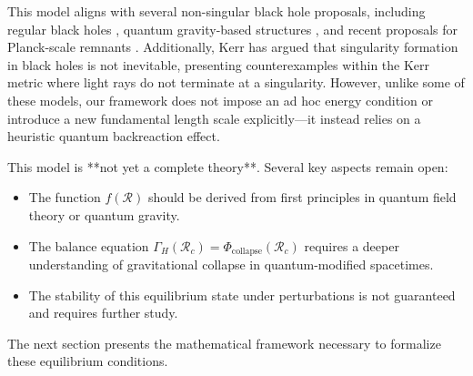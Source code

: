 This model aligns with several non-singular black hole proposals, including regular black holes \cite{bardeen1968non, hayward2006formation}, quantum gravity-based structures \cite{bojowald2005nonsingular, rovelli1996black}, and recent proposals for Planck-scale remnants \cite{brustein2018black}. Additionally, Kerr \cite{kerr2023singularities} has argued that singularity formation in black holes is not inevitable, presenting counterexamples within the Kerr metric where light rays do not terminate at a singularity. However, unlike some of these models, our framework does not impose an ad hoc energy condition or introduce a new fundamental length scale explicitly—it instead relies on a heuristic quantum backreaction effect.

This model is **not yet a complete theory**. Several key aspects remain open:
\begin{itemize}
    \item The function \( f(\mathcal{R}) \) should be derived from first principles in quantum field theory or quantum gravity.
    \item The balance equation \( \Gamma_H(\mathcal{R}_c) = \Phi_{\text{collapse}}(\mathcal{R}_c) \) requires a deeper understanding of gravitational collapse in quantum-modified spacetimes.
    \item The stability of this equilibrium state under perturbations is not guaranteed and requires further study.
\end{itemize}

The next section presents the mathematical framework necessary to formalize these equilibrium conditions.
